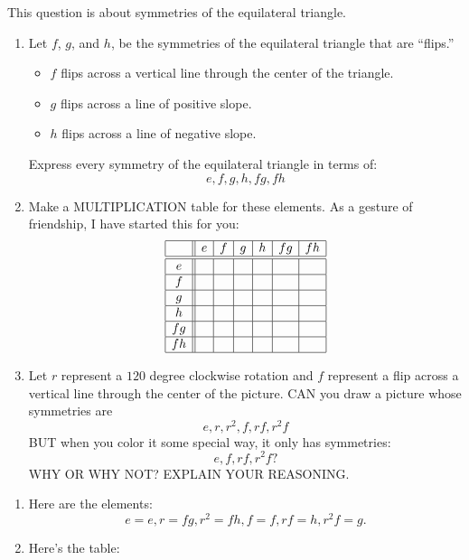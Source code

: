 \documentclass[noauthor,nooutcomes,hints]{ximera}
\begin{document}
\begin{question}
  This question is about symmetries of the equilateral triangle.
  \begin{enumerate}
  \item Let $f$, $g$, and $h$, be the symmetries of the equilateral
    triangle that are ``flips.''
    \begin{itemize}
    \item $f$ flips across a vertical line through the center of the triangle.
    \item $g$ flips across a line of positive slope.
    \item $h$ flips across a line of negative slope.
    \end{itemize}
    Express every symmetry of the equilateral triangle in terms of:
    \[
    e,f,g,h,fg,fh
    \]
  \item Make a MULTIPLICATION table for these elements. As a gesture
    of friendship, I have started this for you:
           \[
  \begin{array}{|c||c|c|c|c|c|c|}
    \hline
    & e & f & g & h & fg & fh\\ \hline\hline
    e &  &   &     &   &    &     \\ \hline
    f &   &     &   &    &      &  \\ \hline
    g &     &   &   &      &   &  \\ \hline
    h  &   &      &    &   &     &  \\ \hline
    fg &    &   &      &   &   &    \\ \hline
    fh &      &    &   &     &   &  \\ \hline
  \end{array}
  \]
  \item Let $r$ represent a $120$ degree clockwise rotation and $f$
    represent a flip across a vertical line through the center of the
    picture. CAN you draw a picture whose symmetries are
    \[
    e,r,r^2,f,rf,r^2f
    \]
    BUT when you color it some special way, it only has symmetries:
    \[
    e,f,rf,r^2f?
    \]
    WHY OR WHY NOT? EXPLAIN YOUR REASONING.
  \end{enumerate}
  \begin{freeResponse}
    \begin{enumerate}
    \item Here are the elements:
      \[
      e = e, r = fg, r^2 = fh, f= f, rf = h, r^2f=g.
      \]
    \item  Here's the table:
      \[
      \begin{array}{|c||c|c|c|c|c|c|}

\end{array}\]
\end{enumerate}
\end{freeResponse}
\end{question}
\end{document}
